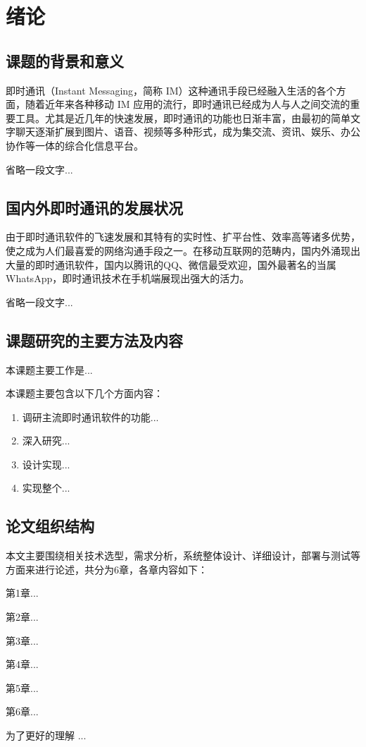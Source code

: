 \section{绪论}
  	\subsection{课题的背景和意义}
	
	即时通讯（Instant Messaging，简称 IM）这种通讯手段已经融入生活的各个方面，随着近年来各种移动 IM 应用的流行，即时通讯已经成为人与人之间交流的重要工具。尤其是近几年的快速发展，即时通讯的功能也日渐丰富，由最初的简单文字聊天逐渐扩展到图片、语音、视频等多种形式，成为集交流、资讯、娱乐、办公协作等一体的综合化信息平台。
	
	省略一段文字...
	
	
	\subsection{国内外即时通讯的发展状况}
	
	由于即时通讯软件的飞速发展和其特有的实时性、扩平台性、效率高等诸多优势，使之成为人们最喜爱的网络沟通手段之一。在移动互联网的范畴内，国内外涌现出大量的即时通讯软件，国内以腾讯的QQ、微信最受欢迎，国外最著名的当属 WhatsApp，即时通讯技术在手机端展现出强大的活力。
	
	省略一段文字...
	
  	\subsection{课题研究的主要方法及内容}

 	本课题主要工作是...

  	本课题主要包含以下几个方面内容：
  
  	\begin{enumerate}
  
    \item 调研主流即时通讯软件的功能...
    
    \item 深入研究...
    
    \item 设计实现...

    \item 实现整个...
    
  	\end{enumerate}

  	\subsection{论文组织结构}
  
  	本文主要围绕相关技术选型，需求分析，系统整体设计、详细设计，部署与测试等方面来进行论述，共分为6章，各章内容如下：
	
	第1章...
	
    第2章...
    
    第3章...
    
    第4章... 
       
    第5章...
    
    第6章...
    
    为了更好的理解 ...
    
\clearpage